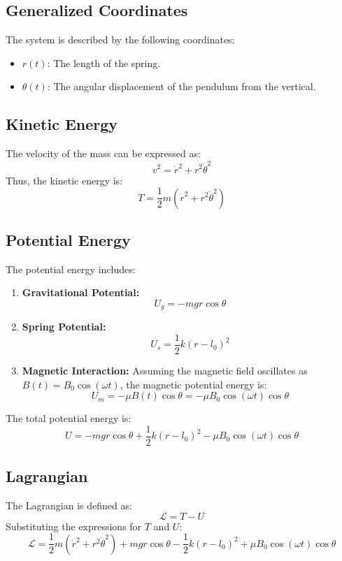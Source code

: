 \documentclass[12pt]{article}
\begin{document}
\subsection{Generalized Coordinates}
The system is described by the following coordinates:
\begin{itemize}
    \item \( r(t) \): The length of the spring.
    \item \( \theta(t) \): The angular displacement of the pendulum from the vertical.
\end{itemize}

\subsection{Kinetic Energy}
The velocity of the mass can be expressed as:
\[
v^2 = \dot{r}^2 + r^2\dot{\theta}^2
\]
Thus, the kinetic energy is:
\[
T = \frac{1}{2}m\left( \dot{r}^2 + r^2\dot{\theta}^2 \right)
\]

\subsection{Potential Energy}
The potential energy includes:
\begin{enumerate}
    \item \textbf{Gravitational Potential:}
    \[
    U_g = -mgr\cos\theta
    \]
    \item \textbf{Spring Potential:}
    \[
    U_s = \frac{1}{2}k(r - l_0)^2
    \]
    \item \textbf{Magnetic Interaction:}
    Assuming the magnetic field oscillates as \( B(t) = B_0\cos(\omega t) \), the magnetic potential energy is:
    \[
    U_m = -\mu B(t)\cos\theta = -\mu B_0\cos(\omega t)\cos\theta
    \]
\end{enumerate}

The total potential energy is:
\[
U = -mgr\cos\theta + \frac{1}{2}k(r - l_0)^2 - \mu B_0\cos(\omega t)\cos\theta
\]

\subsection{Lagrangian}
The Lagrangian is defined as:
\[
\mathcal{L} = T - U
\]
Substituting the expressions for \( T \) and \( U \):
\[
\mathcal{L} = \frac{1}{2}m\left( \dot{r}^2 + r^2\dot{\theta}^2 \right) + mgr\cos\theta - \frac{1}{2}k(r - l_0)^2 + \mu B_0\cos(\omega t)\cos\theta
\]
\\\\
\end{document}
